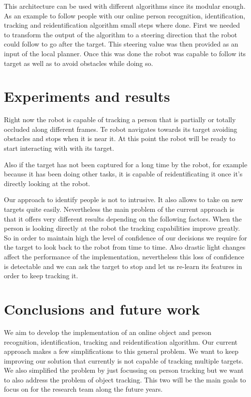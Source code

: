 This architecture can be used with different algorithms since its modular enough.
As an example to follow people with our online person recognition, identification, tracking and reidentification algorithm small steps where done.
First we needed to transform the output of the algorithm to a steering direction that the robot could follow to go after the target.
This steering value was then provided as an input of the local planner.
Once this was done the robot was capable to follow its target as well as to avoid obstacles while doing so.

\section{Experiments and results}
Right now the robot is capable of tracking a person that is partially or totally occluded along different frames.
Te robot navigates towards its target avoiding obstacles and stops when it is near it.
At this point the robot will be ready to start interacting with with its target.

Also if the target has not been captured for a long time by the robot, for example because it has been doing other tasks, it is capable of reidentificating it once it's directly looking at the robot.

Our approach to identify people is not to intrusive.
It also allows to take on new targets quite easily.
Nevertheless the main problem of the current approach is that it offers very different results depending on the following factors.
When the person is looking directly at the robot the tracking capabilities improve greatly.
So in order to maintain high the level of confidence of our decisions we require for the target to look back to the robot from time to time.
Also drastic light changes affect the performance of the implementation, nevertheless this loss of confidence is detectable and we can ask the target to stop and let us re-learn its features in order to keep tracking it.

\section{Conclusions and future work}
We aim to develop the implementation of an online object and person recognition, identification, tracking and reidentification algorithm.
Our current approach makes a few simplifications to this general problem.
We want to keep improving our solution that currently is not capable of tracking multiple targets.
We also simplified the problem by just focussing on person tracking but we want to also address the problem of object tracking.
This two will be the main goals to focus on for the research team along the future years.

